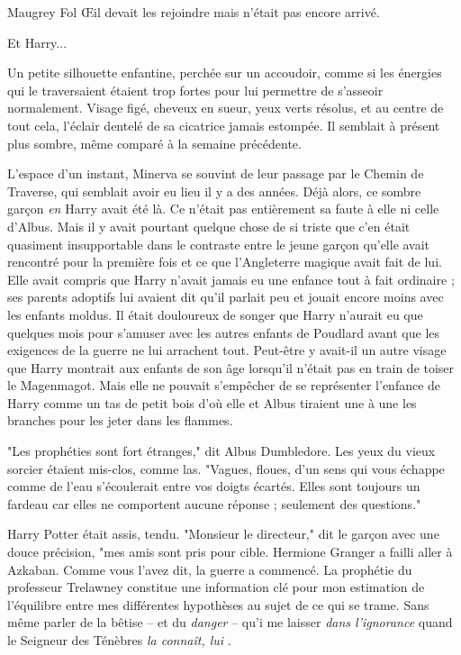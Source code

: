 Maugrey Fol Œil devait les rejoindre mais n'était pas encore arrivé.

Et Harry...

Un petite silhouette enfantine, perchée sur un accoudoir, comme si les énergies qui le traversaient étaient trop fortes pour lui permettre de s'asseoir normalement. Visage figé, cheveux en sueur, yeux verts résolus, et au centre de tout cela, l'éclair dentelé de sa cicatrice jamais estompée. Il semblait à présent plus sombre, même comparé à la semaine précédente.

L'espace d'un instant, Minerva se souvint de leur passage par le Chemin de Traverse, qui semblait avoir eu lieu il y a des années. Déjà alors, ce sombre garçon \emph{en}  Harry avait été là. Ce n'était pas entièrement sa faute à elle ni celle d'Albus. Mais il y avait pourtant quelque chose de si triste que c'en était quasiment insupportable dans le contraste entre le jeune garçon qu'elle avait rencontré pour la première fois et ce que l'Angleterre magique avait fait de lui. Elle avait compris que Harry n'avait jamais eu une enfance tout à fait ordinaire ; ses parents adoptifs lui avaient dit qu'il parlait peu et jouait encore moins avec les enfants moldus. Il était douloureux de songer que Harry n'aurait eu que quelques mois pour s'amuser avec les autres enfants de Poudlard avant que les exigences de la guerre ne lui arrachent tout. Peut-être y avait-il un autre visage que Harry montrait aux enfants de son âge lorsqu'il n'était pas en train de toiser le Magenmagot. Mais elle ne pouvait s'empêcher de se représenter l'enfance de Harry comme un tas de petit bois d'où elle et Albus tiraient une à une les branches pour les jeter dans les flammes.

"Les prophéties sont fort étranges," dit Albus Dumbledore. Les yeux du vieux sorcier étaient mis-clos, comme las. "Vagues, floues, d'un sens qui vous échappe comme de l'eau s'écoulerait entre vos doigts écartés. Elles sont toujours un fardeau car elles ne comportent aucune réponse ; seulement des questions."

Harry Potter était assis, tendu. "Monsieur le directeur," dit le garçon avec une douce précision, "mes amis sont pris pour cible. Hermione Granger a failli aller à Azkaban. Comme vous l'avez dit, la guerre a commencé. La prophétie du professeur Trelawney constitue une information clé pour mon estimation de l'équilibre entre mes différentes hypothèses au sujet de ce qui se trame. Sans même parler de la bêtise – et du \emph{danger}  – qu'i me laisser \emph{dans l'ignorance } quand le Seigneur des Ténèbres \emph{la connaît, lui} .

